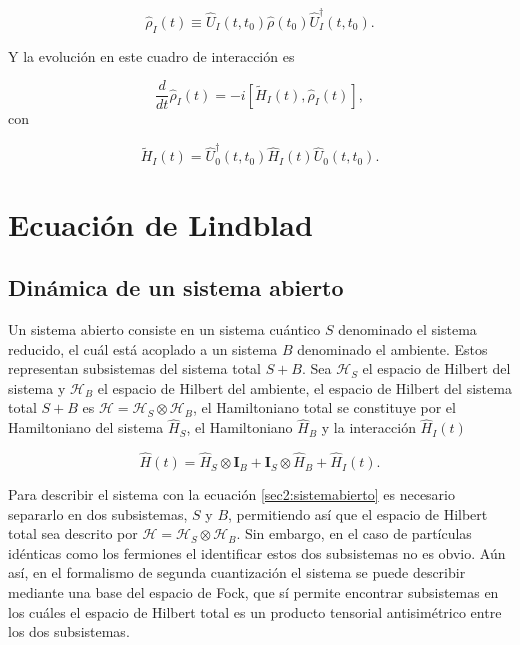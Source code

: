 \begin{equation*}
    \hat{\rho}_{I}(t) \equiv \hat{U}_{I}(t,t_{0})\hat{\rho}(t_{0})\hat{U}^{\dagger}_{I}(t,t_{0}).
\end{equation*}

Y la evolución en este cuadro de interacción es 

\begin{equation}
    \frac{d}{dt}\hat{\rho}_{I}(t) = -i[\tilde{H}_{I}(t), \hat{\rho}_{I}(t)],
    \label{sec11:interactionp}
\end{equation}
con 

\begin{equation*}
    \tilde{H}_{I}(t) = \hat{U}^{\dagger}_{0}(t,t_{0})\hat{H}_{I}(t)\hat{U}_{0}(t,t_{0}).
\end{equation*}

\label{sec:closedQM}



\section{Ecuación de Lindblad}
\label{SEClindblad}
\subsection{Dinámica de un sistema abierto}

Un sistema abierto consiste en un sistema cuántico $S$ denominado el sistema reducido, el cuál está acoplado a un sistema $B$ denominado el ambiente. Estos representan  subsistemas del sistema total $S+B$. Sea $\mathcal{H}_{S}$ el espacio de Hilbert del sistema y $\mathcal{H}_{B}$ el espacio de Hilbert del ambiente, el espacio de Hilbert del sistema total $S+B$ es  $\mathcal{H} = \mathcal{H}_{S} \otimes \mathcal{H}_{B}$, el Hamiltoniano total se constituye por el Hamiltoniano del sistema $\hat{H}_{S}$, el Hamiltoniano $\hat{H}_{B}$ y la interacción $\hat{H}_{I}(t)$

\begin{equation}
    \hat{H}(t) = \hat{H}_{S} \otimes \mathbf{I}_{B} + \mathbf{I}_{S} \otimes \hat{H}_{B} + \hat{H}_{I}(t).
    \label{sec2:sistemabierto}
\end{equation}


Para describir el sistema con la ecuación \ref{sec2:sistemabierto} es necesario separarlo en dos subsistemas, $S$ y $B$, permitiendo así que el espacio de Hilbert total sea descrito por $\mathcal{H} = \mathcal{H}_{S}\otimes \mathcal{H}_{B}$. Sin embargo, en el caso de partículas idénticas como los fermiones el identificar estos dos subsistemas no es obvio. Aún así, en el formalismo de segunda cuantización el sistema se puede describir mediante una base del espacio de Fock, que sí permite encontrar subsistemas en los cuáles el espacio de Hilbert total es un producto tensorial antisimétrico entre los dos subsistemas\cite{friis2013fermionic,vidal2021quantum}.

